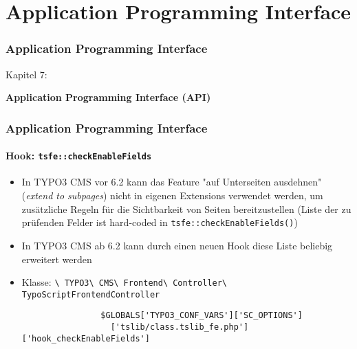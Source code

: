 %

\section{Application Programming Interface}
\begin{frame}[fragile]
	\frametitle{Application Programming Interface}

	\begin{center}\huge{Kapitel 7:}\end{center}
	\begin{center}\huge{\color{typo3darkgrey}\textbf{Application Programming Interface (API)}}\end{center}

\end{frame}


\begin{frame}[fragile]
	\frametitle{Application Programming Interface}
	\framesubtitle{Hook: \texttt{tsfe::checkEnableFields}}

	\begin{itemize}
		\item In TYPO3 CMS vor 6.2 kann das Feature "auf Unterseiten ausdehnen" (\emph{extend to subpages}) nicht in eigenen Extensions verwendet werden, um zusätzliche Regeln für die Sichtbarkeit von Seiten bereitzustellen\newline
			\smaller(Liste der zu prüfenden Felder ist hard-coded in \texttt{tsfe::checkEnableFields()})\normalsize
		\item In TYPO3 CMS ab 6.2 kann durch einen neuen Hook diese Liste beliebig erweitert werden

		\item Klasse:\newline
			\smaller
				\texttt{\textbackslash
					TYPO3\textbackslash
					CMS\textbackslash
					Frontend\textbackslash
					Controller\textbackslash
					TypoScriptFrontendController}\normalsize

			\lstset{
				basicstyle=\smaller\ttfamily
			}

			\begin{lstlisting}
				$GLOBALS['TYPO3_CONF_VARS']['SC_OPTIONS']
				  ['tslib/class.tslib_fe.php']['hook_checkEnableFields']
			\end{lstlisting}

	\end{itemize}

\end{frame}

